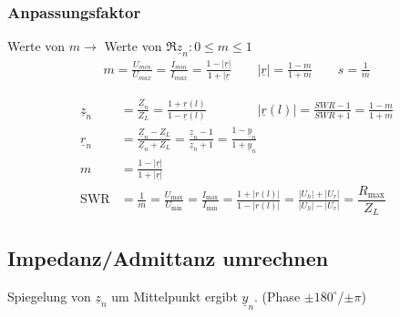\subsubsection{Anpassungsfaktor}
Werte von $ m \rightarrow$ Werte von $ \Re{\underline{z}_n}: 0 \leq m \leq1 $
\begin{align*}
	m = \frac{U_{min}}{U_{max}} = \frac{I_{min}}{I_{max}}=\frac{1-|\underline{r}|}{1+|\underline{r}} \qquad  |\underline{r}| = \frac{1-m}{1+m} \qquad s=\frac{1}{m}
\end{align*}
\begin{center}
    
\end{center}
\begin{align*}
    \underline{z}_n & = \frac{\underline{Z}_n}{Z_L} = \frac{1+\underline{r}(l)}{1-\underline{r}(l)} \qquad \qquad |\underline{r}(l)|=\frac{\si{SWR}-1}{\si{SWR}+1} = \frac{1-m}{1+m}
    \\
    \underline{r}_n & = \frac{\underline{Z}_n-Z_L}{\underline{Z}_n+Z_L}= \frac{\underline{z}_n-1}{\underline{z}_n+1}    = \frac{1-\underline{y}_n}{1+\underline{y}_n} \\
    m               & = \frac{1-|\underline{r}|}{1+|\underline{r}|}                                                                                                   \\
    \mathrm{SWR}               & = \frac{1}{m} = \frac{U_\text{max}}{U_\text{min}} = \frac{I_\text{max}}{I_\text{min}} = \frac{1+|r(l)|}{1-|r(l)|} = \frac{|U_h|+|U_r|}{|U_h|-|U_r|}= \dfrac{R_{\text{max}}}{Z_L}
\end{align*}


\subsection{Impedanz/Admittanz umrechnen}
Spiegelung von $ \underline{z}_n $ um Mittelpunkt ergibt $ \underline{y}_n $.  (Phase $\pm 180^{\circ}$/$\pm \pi$)



